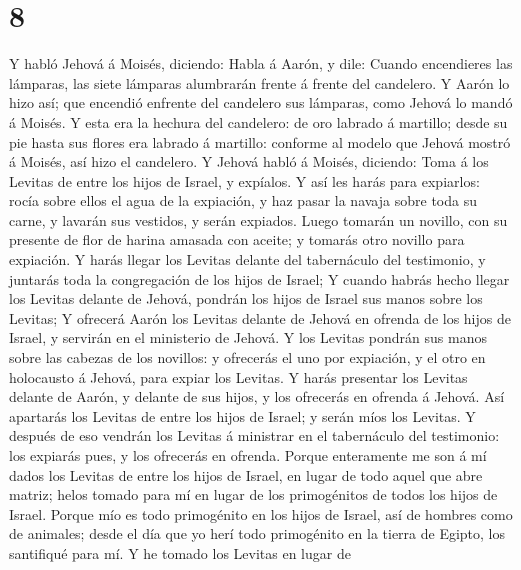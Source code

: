 \hypertarget{section-7}{%
\section{8}\label{section-7}}

 Y habló Jehová á Moisés, diciendo:  Habla á
Aarón, y dile: Cuando encendieres las lámparas, las siete lámparas
alumbrarán frente á frente del candelero.  Y Aarón lo hizo
así; que encendió enfrente del candelero sus lámparas, como Jehová lo
mandó á Moisés.  Y esta era la hechura del candelero: de
oro labrado á martillo; desde su pie hasta sus flores era labrado á
martillo: conforme al modelo que Jehová mostró á Moisés, así hizo el
candelero.  Y Jehová habló á Moisés, diciendo:
 Toma á los Levitas de entre los hijos de Israel, y
expíalos.  Y así les harás para expiarlos: rocía sobre
ellos el agua de la expiación, y haz pasar la navaja sobre toda su
carne, y lavarán sus vestidos, y serán expiados.  Luego
tomarán un novillo, con su presente de flor de harina amasada con
aceite; y tomarás otro novillo para expiación.  Y harás
llegar los Levitas delante del tabernáculo del testimonio, y juntarás
toda la congregación de los hijos de Israel;  Y cuando
habrás hecho llegar los Levitas delante de Jehová, pondrán los hijos de
Israel sus manos sobre los Levitas;  Y ofrecerá Aarón los
Levitas delante de Jehová en ofrenda de los hijos de Israel, y servirán
en el ministerio de Jehová.  Y los Levitas pondrán sus
manos sobre las cabezas de los novillos: y ofrecerás el uno por
expiación, y el otro en holocausto á Jehová, para expiar los Levitas.
 Y harás presentar los Levitas delante de Aarón, y
delante de sus hijos, y los ofrecerás en ofrenda á Jehová.
 Así apartarás los Levitas de entre los hijos de Israel;
y serán míos los Levitas.  Y después de eso vendrán los
Levitas á ministrar en el tabernáculo del testimonio: los expiarás pues,
y los ofrecerás en ofrenda.  Porque enteramente me son á
mí dados los Levitas de entre los hijos de Israel, en lugar de todo
aquel que abre matriz; helos tomado para mí en lugar de los primogénitos
de todos los hijos de Israel.  Porque mío es todo
primogénito en los hijos de Israel, así de hombres como de animales;
desde el día que yo herí todo primogénito en la tierra de Egipto, los
santifiqué para mí.  Y he tomado los Levitas en lugar de
